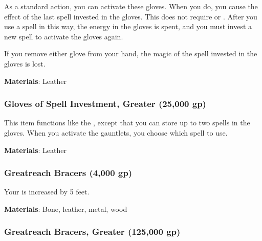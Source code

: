 As a standard action, you can activate these gloves.
When you do, you cause the effect of the last spell invested in the gloves.
This does not require  or .
After you use a spell in this way, the energy in the gloves is spent, and you must invest a new spell to activate the gloves again.

If you remove either glove from your hand, the magic of the spell invested in the gloves is lost.



\vspace{0.25em}
\textbf{Materials}: Leather


\lowercase{\hypertarget{item:Gloves of Spell Investment, Greater}{}}\label{item:Gloves of Spell Investment, Greater}
\hypertarget{item:Gloves of Spell Investment, Greater}{\subsubsection{Gloves of Spell Investment, Greater\hfill{} (25,000 gp)}}

This item functions like the , except that you can store up to two spells in the gloves.
When you activate the gauntlets, you choose which spell to use.



\vspace{0.25em}
\textbf{Materials}: Leather


\lowercase{\hypertarget{item:Greatreach Bracers}{}}\label{item:Greatreach Bracers}
\hypertarget{item:Greatreach Bracers}{\subsubsection{Greatreach Bracers\hfill{} (4,000 gp)}}

Your  is increased by 5 feet.



\vspace{0.25em}
\textbf{Materials}: Bone, leather, metal, wood


\lowercase{\hypertarget{item:Greatreach Bracers, Greater}{}}\label{item:Greatreach Bracers, Greater}
\hypertarget{item:Greatreach Bracers, Greater}{\subsubsection{Greatreach Bracers, Greater\hfill{} (125,000 gp)}}

